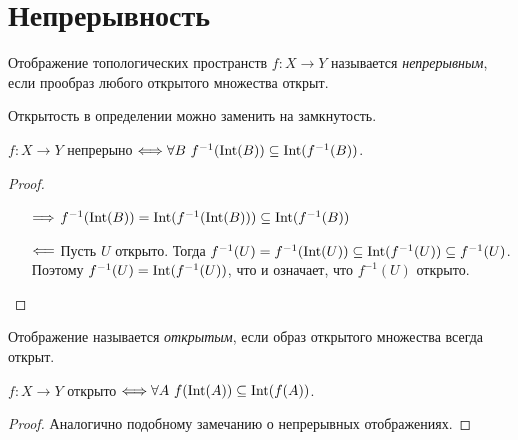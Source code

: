 \section{Непрерывность}

\begin{definition}
	Отображение топологических пространств $f \colon X \to Y$ называется
	\textit{непрерывным}, если прообраз любого открытого множества открыт.
\end{definition}

\begin{remark}
	Открытость в определении можно заменить на замкнутость.
\end{remark}

\begin{remark}
	$f \colon X \to Y$ непрерыно $\Longleftrightarrow \forall B~ f^{-1}(\operatorname{Int}(B)) \subseteq 
	\operatorname{Int}(f^{-1}(B))$.
\end{remark}
\begin{proof}
	\enewline
	\begin{itemize}
		\item[$\Longrightarrow$] $f^{-1}(\operatorname{Int}(B)) = \operatorname{Int}(f^{-1}(\operatorname{Int}(B))) \subseteq \operatorname{Int}(f^{-1}(B))$
		\item[$\Longleftarrow$] Пусть $U$ открыто. Тогда 
			$f^{-1}(U) = f^{-1}(\operatorname{Int}(U)) \subseteq \operatorname{Int}(f^{-1}(U)) \subseteq f^{-1}(U)$.
			Поэтому $f^{-1}(U) = \operatorname{Int}(f^{-1}(U))$, что и означает, что $f^{-1}(U)$
			открыто.
	\end{itemize}
\end{proof}


\begin{definition}
	Отображение называется \textit{открытым}, если образ открытого множества
	всегда открыт.
\end{definition}

\begin{remark}
	$f \colon X \to Y$ открыто $\Longleftrightarrow \forall A~ f(\operatorname{Int}(A)) \subseteq \operatorname{Int}(f(A))$.
\end{remark}
\begin{proof}
	Аналогично подобному замечанию о непрерывных отображениях.
\end{proof}

